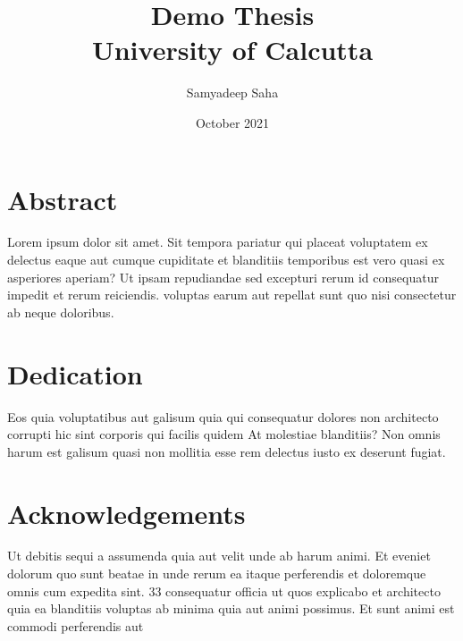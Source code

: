 \documentclass{report}
\title{Demo Thesis\\ {\Large University of Calcutta}}
\author{Samyadeep Saha}
\date{October 2021}
\begin{document}
\maketitle

\chapter*{Abstract}
Lorem ipsum dolor sit amet. Sit tempora pariatur qui 
placeat voluptatem ex delectus eaque aut cumque cupiditate
et blanditiis temporibus est vero quasi ex asperiores
aperiam? Ut ipsam repudiandae sed excepturi rerum id
consequatur impedit et rerum reiciendis. voluptas earum aut
repellat sunt quo nisi consectetur ab neque doloribus.

\chapter*{Dedication}
 Eos quia voluptatibus aut galisum quia qui consequatur
 dolores non architecto corrupti hic sint corporis qui
 facilis quidem At molestiae blanditiis? Non omnis harum
 est galisum quasi non mollitia esse rem delectus iusto
 ex deserunt fugiat.

 \chapter*{Acknowledgements}
 Ut debitis sequi a assumenda quia aut velit unde ab harum
 animi. Et eveniet dolorum quo sunt beatae in unde rerum ea
 itaque perferendis et doloremque omnis cum expedita sint.
 33 consequatur officia ut quos explicabo et architecto
 quia ea blanditiis voluptas ab minima quia aut animi
 possimus. Et sunt animi est commodi perferendis aut

 \tableofcontents

 
 
 
 \appendix
 
\end{document}
